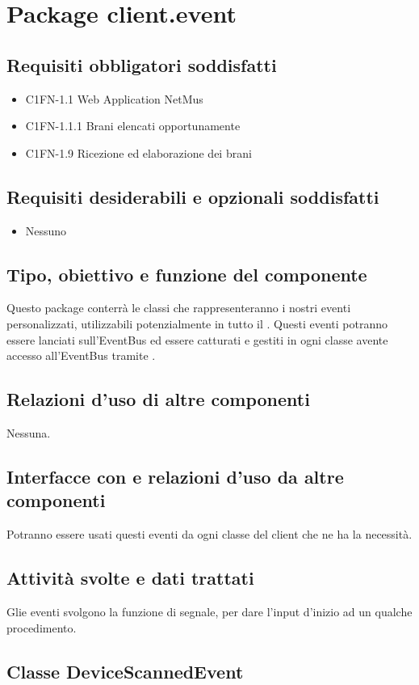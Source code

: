 \newpage
\section{Package client.event}
\subsection*{Requisiti obbligatori soddisfatti}
\begin{itemize}
    \item C1FN-1.1 Web Application NetMus
    \item C1FN-1.1.1 Brani elencati opportunamente
    \item C1FN-1.9 Ricezione ed elaborazione dei brani
\end{itemize}
\subsection*{Requisiti desiderabili e opzionali soddisfatti}
\begin{itemize}
    \item Nessuno
\end{itemize}
\subsection*{Tipo, obiettivo e funzione del componente}
Questo package conterr\`a le classi che rappresenteranno i nostri eventi
personalizzati, utilizzabili potenzialmente in tutto il .
Questi eventi potranno essere lanciati sull'EventBus ed essere catturati e
gestiti in ogni classe avente accesso all'EventBus tramite .
\subsection*{Relazioni d'uso di altre componenti}
Nessuna.
\subsection*{Interfacce con e relazioni d'uso da altre componenti}
Potranno essere usati questi eventi da ogni classe del client che ne ha la
necessit\`a.
\subsection*{Attivit\`a svolte e dati trattati}
Glie eventi svolgono la funzione di segnale, per dare l'input d'inizio ad un
qualche procedimento.

\subsection{Classe DeviceScannedEvent}
